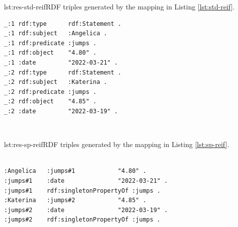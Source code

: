 \begin{minipage}{0.42\linewidth}
\begin{captionedlisting}{lst:res-std-reif}{RDF triples generated by the mapping in Listing \ref{lst:std-reif}.}
\centering
{\begin{lstlisting}[basicstyle=\ttfamily\small,label={list:example1},columns=flexible]
_:1 rdf:type      rdf:Statement .
_:1 rdf:subject   :Angelica .
_:1 rdf:predicate :jumps .
_:1 rdf:object    "4.80" .
_:1 :date         "2022-03-21" .
_:2 rdf:type      rdf:Statement .
_:2 rdf:subject   :Katerina .
_:2 rdf:predicate :jumps .
_:2 rdf:object    "4.85" .
_:2 :date         "2022-03-19" .
\end{lstlisting}}
\end{captionedlisting}
\end{minipage}
\,\,\,\,
\begin{minipage}{0.5\linewidth}
\begin{captionedlisting}{lst:res-sp-reif}{RDF triples generated by the mapping in Listing \ref{lst:sp-reif}.}
\centering
{\begin{lstlisting}[basicstyle=\ttfamily\small,label={list:example1},columns=flexible]

:Angelica   :jumps#1            "4.80" .
:jumps#1    :date               "2022-03-21" .
:jumps#1    rdf:singletonPropertyOf :jumps .
:Katerina   :jumps#2            "4.85" .
:jumps#2    :date               "2022-03-19" .
:jumps#2    rdf:singletonPropertyOf :jumps .

\end{lstlisting}}
\end{captionedlisting}
\end{minipage}





